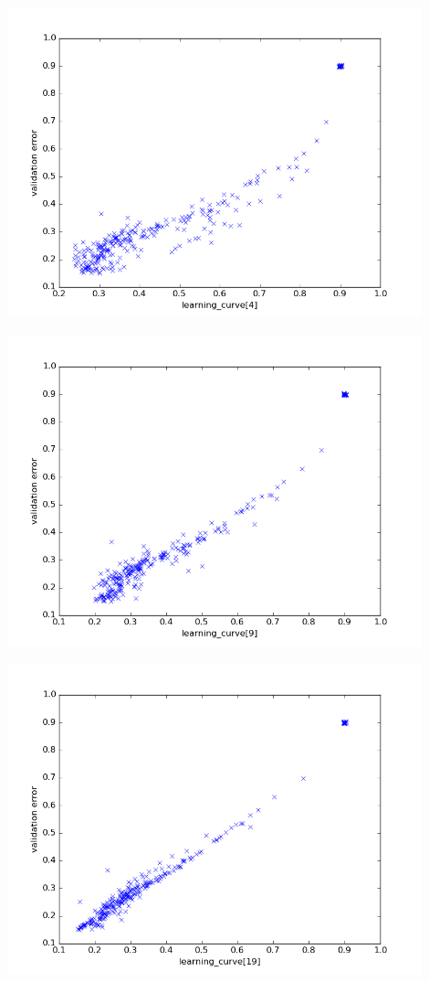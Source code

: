\documentclass[a4paper,10pt]{article}
\begin{document}
\includegraphics[width=0.9\textwidth]{../../figures/learning_curve4}

\includegraphics[width=0.9\textwidth]{../../figures/learning_curve9}

\includegraphics[width=0.9\textwidth]{../../figures/learning_curve19}
\end{document}
